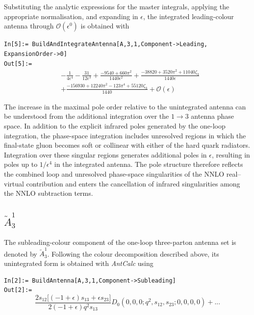 Substituting the analytic expressions for the master integrals, applying the
appropriate normalisation, and expanding in $\epsilon$, the integrated leading-colour
antenna through $\mathcal O(\epsilon^0)$ is obtained with

\begin{mdframed}[backgroundcolor=gray!10, linewidth=0pt]
\texttt{In[5]:= BuildAndIntegrateAntenna[A,3,1,Component->Leading,\\ExpansionOrder->0]}\\
\hfill
\texttt{Out[5]:=}
    \begin{equation*}
        \begin{split}
            &-\frac1{4\epsilon^4}-\frac{31}{12\epsilon^3}+\frac{-9540+660\pi^2}{1440\epsilon^2}+\frac{-38820+3520\pi^2+11040\zeta_3}{1440\epsilon}\\
            &+\frac{-156930+12240\pi^2-123\pi^4+55120\zeta_3}{1440}+\mathcal O(\epsilon)
        \end{split}
    \end{equation*}
\end{mdframed}

The increase in the maximal pole order relative to the unintegrated antenna can be
understood from the additional integration over the $1\to3$ antenna phase space. In
addition to the explicit infrared poles generated by the one-loop integration, the
phase-space integration includes unresolved regions in which the final-state gluon
becomes soft or collinear with either of the hard quark radiators. Integration over
these singular regions generates additional poles in $\epsilon$, resulting in poles up
to $1/\epsilon^4$ in the integrated antenna. The pole structure therefore reflects the
combined loop and unresolved phase-space singularities of the NNLO real--virtual
contribution and enters the cancellation of infrared singularities among the NNLO
subtraction terms.

\subsection{$\tilde A_3^1$}\label{subsec:A31sub}

The subleading-colour component of the one-loop three-parton antenna set is denoted
by $\widetilde A_3^1$. Following the colour decomposition described above, its
unintegrated form is obtained with \textit{AntCalc} using

\begin{mdframed}[backgroundcolor=gray!10, linewidth=0pt]
\texttt{In[2]:= BuildAntenna[A,3,1,Component->Subleading]}\\
\hfill
\texttt{Out[2]:=}
    \begin{equation*}
        \frac{2s_{12}\Big[(-1+\epsilon)s_{13}+\epsilon s_{23}\Big]}{2(-1+\epsilon)q^2s_{13}}D_0\!\left(0,0,0;q^2,s_{12},s_{23};0,0,0,0\right)+...
    \end{equation*}
\end{mdframed}

